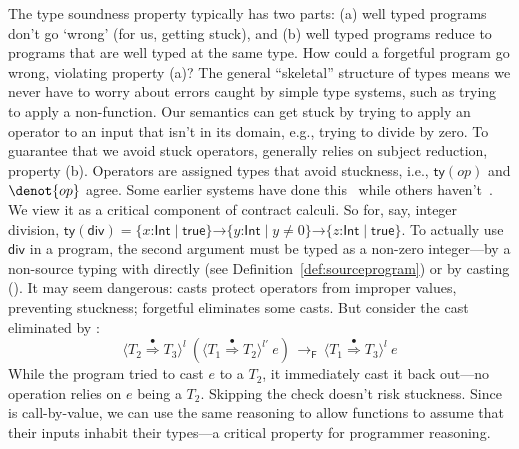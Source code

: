 \documentclass[9pt]{extarticle}
\newcommand{\ottnt}[1]{\mathit{#1}}
\newcommand{\ottsym}[1]{#1}
\begin{document}
{The type soundness property typically has two parts:
(a) well typed programs don't go `wrong' (for us, getting stuck), and 
(b) well typed programs reduce to programs that are well typed at the
same type.
How could a forgetful \lambdah program go wrong, violating property
(a)? The general ``skeletal'' structure of types means we never have
to worry about errors caught by simple type systems, such as trying to
apply a non-function. Our semantics can get stuck by trying to apply
an operator to an input that isn't in its domain, e.g., trying to
divide by zero.
To guarantee that we avoid stuck operators, \lambdah generally relies
on subject reduction, property (b). Operators are assigned types that
avoid stuckness, i.e., $ \mathsf{ty} (\mathord{ \ottnt{op} }) $ and $ \denot{ op } $ agree. Some
earlier systems have done this~\cite{Flanagan06hybrid,Knowles10hybrid}
while others haven't~\cite{Greenberg12contracts,Belo11fh}. We view it
as a critical component of contract calculi.
So for, say, integer division, $ \mathsf{ty} (\mathord{  \mathsf{div}  })   \ottsym{=}     \{ \mathit{x} \mathord{:}  \mathsf{Int}  \mathrel{\mid}  \mathsf{true}  \}  \mathord{ \rightarrow }  \{ \mathit{y} \mathord{:}  \mathsf{Int}  \mathrel{\mid}  \mathit{y}  \mathrel{\ne}  \ottsym{0}  \}   \mathord{ \rightarrow }  \{ \mathit{z} \mathord{:}  \mathsf{Int}  \mathrel{\mid}  \mathsf{true}  \}  $. To actually use $ \mathsf{div} $
in a program, the second argument must be typed as a non-zero
integer---by a non-source typing with  directly (see
Definition~\ref{def:sourceprogram}) or by casting ().
It may seem dangerous: casts protect operators from improper values,
preventing stuckness; forgetful \lambdah eliminates some casts. But
consider the cast eliminated by :
\[  \langle  \ottnt{T_{{\mathrm{2}}}}  \mathord{ \overset{\bullet}{\Rightarrow} }  \ottnt{T_{{\mathrm{3}}}}  \rangle^{ \ottnt{l} } ~   (  \langle  \ottnt{T_{{\mathrm{1}}}}  \mathord{ \overset{\bullet}{\Rightarrow} }  \ottnt{T_{{\mathrm{2}}}}  \rangle^{ \ottnt{l'} } ~  \ottnt{e}  )   \,  \longrightarrow _{  \mathsf{F}  }  \,  \langle  \ottnt{T_{{\mathrm{1}}}}  \mathord{ \overset{\bullet}{\Rightarrow} }  \ottnt{T_{{\mathrm{3}}}}  \rangle^{ \ottnt{l} } ~  \ottnt{e}  \]
While the program tried to cast $\ottnt{e}$ to a $\ottnt{T_{{\mathrm{2}}}}$, it immediately
cast it back out---no operation relies on $\ottnt{e}$ being a
$\ottnt{T_{{\mathrm{2}}}}$. Skipping the check doesn't risk stuckness.
Since \lambdah is call-by-value, we can use the same reasoning to
allow functions to assume that their inputs inhabit their types---a
critical property for programmer reasoning.

}
\end{document}
